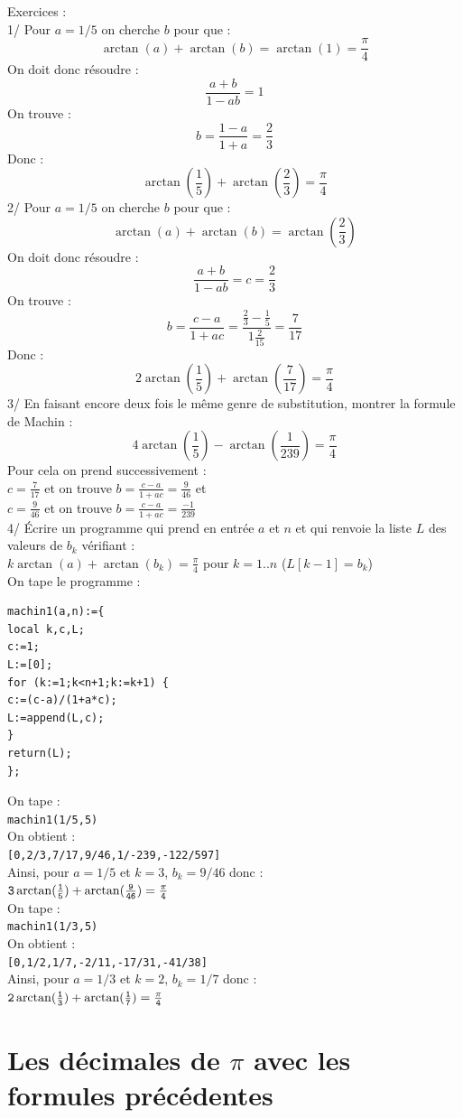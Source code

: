 \documentclass[a4paper,11pt]{book}
\begin{document}
Exercices :\\
1/ Pour $a=1/5$ on cherche $b$ pour que :
$$\arctan(a)+\arctan(b)=\arctan(1)=\frac{\pi}{4}$$
On doit donc r\'esoudre :
$$\frac{a+b}{1-ab}=1$$
On trouve :
$$b=\frac{1-a}{1+a}=\frac{2}{3}$$
Donc :
$$\arctan(\frac{1}{5})+\arctan(\frac{2}{3})=\frac{\pi}{4}$$
2/  Pour $a=1/5$ on cherche $b$ pour que :
$$\arctan(a)+\arctan(b)=\arctan(\frac{2}{3})$$
On doit donc r\'esoudre :
$$\frac{a+b}{1-ab}=c=\frac{2}{3}$$
On trouve :
$$b=\frac{c-a}{1+ac}=\frac{\frac{2}{3}-\frac{1}{5}}{1\frac{2}{15}}=\frac{7}{17}$$
Donc :
$$2\arctan(\frac{1}{5})+\arctan(\frac{7}{17})=\frac{\pi}{4}$$
3/ En faisant encore deux fois le m\^eme genre de substitution, montrer la 
formule de Machin  :
$$4\arctan(\frac{1}{5})-\arctan(\frac{1}{239})=\frac{\pi}{4}$$
Pour cela on prend successivement :\\
$c=\frac{7}{17}$ et on trouve $b=\frac{c-a}{1+ac}=\frac{9}{46}$ et\\
$c=\frac{9}{46}$ et on trouve $b=\frac{c-a}{1+ac}=\frac{-1}{239}$\\
4/ \'Ecrire un programme qui prend en entr\'ee $a$ et $n$ et qui
renvoie la liste $L$ des valeurs de $b_k$ v\'erifiant :\\
$k\arctan(a)+\arctan(b_k)=\frac{\pi}{4}$ pour $k=1..n$ ($L[k-1]=b_k$)\\
On tape le programme :
\begin{verbatim}
machin1(a,n):={
local k,c,L;
c:=1;
L:=[0];
for (k:=1;k<n+1;k:=k+1) {
c:=(c-a)/(1+a*c);
L:=append(L,c);
}
return(L);
};
\end{verbatim}
On tape :\\
{\tt machin1(1/5,5)}\\
On obtient :\\
{\tt [0,2/3,7/17,9/46,1/-239,-122/597]}\\
Ainsi, pour  $a=1/5$ et $k=3$, $b_k=9/46$ donc :\\
${\tt 3\arctan(\frac{1}{5})+\arctan(\frac{9}{46})=\frac{\pi}{4}}$\\ 
On tape :\\
{\tt machin1(1/3,5)}\\
On obtient :\\
{\tt [0,1/2,1/7,-2/11,-17/31,-41/38]}\\
Ainsi, pour $a=1/3$ et $k=2$, $b_k=1/7$ donc :\\
${\tt 2\arctan(\frac{1}{3})+\arctan(\frac{1}{7})=\frac{\pi}{4}}$\\ 
\section{Les d\'ecimales de $\pi$ avec les formules pr\'ec\'edentes}
\end{document}
